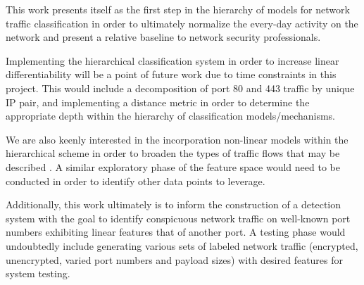 This work presents itself as the first step in the hierarchy of models for network traffic classification in order to ultimately normalize the every-day activity on the network and present a relative baseline to network security professionals.

Implementing the hierarchical classification system in order to increase linear differentiability will be a point of future work due to time constraints in this project. This would include a decomposition of port 80 and 443 traffic by unique IP pair, and implementing a distance metric in order to determine the appropriate depth within the hierarchy of classification models/mechanisms.

We are also keenly interested in the incorporation non-linear models within the hierarchical scheme in order to broaden the types of traffic flows that may be described \cite{PALMIERI2010737}. A similar exploratory phase of the feature space would need to be conducted in order to identify other data points to leverage.

Additionally, this work ultimately is to inform the construction of a detection system with the goal to identify conspicuous network traffic on well-known port numbers exhibiting linear features that of another port. A testing phase would undoubtedly include generating various sets of labeled network traffic (encrypted, unencrypted, varied port numbers and payload sizes) with desired features for system testing.